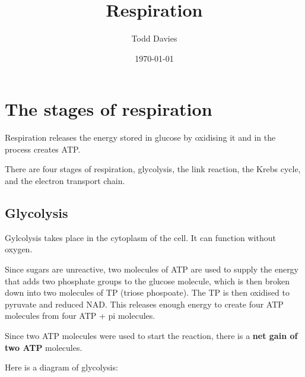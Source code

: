 \documentclass{article}
\title{Respiration}
\author{Todd Davies}
\date{\today}
\begin{document}
\lhead{\today}

\maketitle

\section*{The stages of respiration}
\thispagestyle{empty}
Respiration releases the energy stored in glucose by oxidising it and in the process creates ATP.

There are four stages of respiration, glycolysis, the link reaction, the Krebs cycle, and the electron transport chain.

\subsection*{Glycolysis}
Gylcolysis takes place in the cytoplasm of the cell. It can function without oxygen.

Since sugars are unreactive, two molecules of ATP are used to supply the energy that adds two phosphate groups to the glucose molecule, which is then broken down into two molecules of TP (triose phospoate). The TP is then oxidised to pyruvate and reduced NAD. This releases enough energy to create four ATP molecules from four ATP + pi molecules.

Since two ATP molecules were used to start the reaction, there is a \textbf{net gain of two ATP} molecules.

Here is a diagram of glycolysis:

\begin{center}
\end{center}
\end{document}
